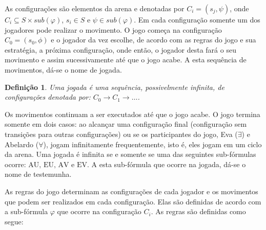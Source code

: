 \documentclass[normaltoc,capchap,capsec,times]{abnt}
\newtheorem{defi}{Definição}[section]
\begin{document}
As configurações são elementos da arena e denotadas por $C_i = (s_j,\psi)$, onde $C_i \subseteq S \times sub(\varphi)$, $s_i \in S$ e $\psi \in sub(\varphi)$. Em cada configuração somente um dos jogadores pode realizar o movimento. O jogo começa na configuração $C_0 = (s_0,\phi)$ e o jogador da vez escolhe, de acordo com as regras do jogo e sua estratégia, a próxima configuração, onde então, o jogador desta fará o seu movimento e assim sucessivamente até que o jogo acabe. A esta sequência de movimentos, dá-se o nome de jogada. 

\begin{defi}
\textnormal{
Uma jogada é uma sequência, possivelmente infinita, de configurações denotada por: $C_0 \to C_1 \to \dots$.
}
\end{defi} 

Os movimentos continuam a ser executados até que o jogo acabe. O jogo termina somente em dois casos: ao alcançar uma configuração final (configuração sem transições para outras configurações) ou se os participantes do jogo, Eva ($\exists$) e Abelardo ($\forall$), jogam infinitamente frequentemente, isto é, eles jogam em um ciclo da arena. Uma jogada é infinita se e somente se uma das seguintes sub-fórmulas ocorre: $\mbox{AU, EU, AV e EV}$. A esta sub-fórmula que ocorre na jogada, \cite{grumbergalg} dá-se o nome de testemunha.

As regras do jogo determinam as configurações de cada jogador e os movimentos que podem ser realizados em cada configuração. Elas são definidas de acordo com a sub-fórmula $\varphi$ que ocorre na configuração $C_i$. As regras são definidas como segue:
\end{document}
